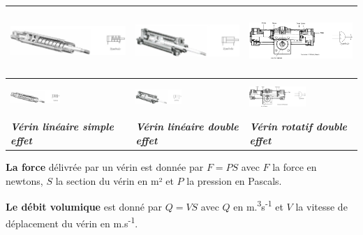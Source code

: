 \begin{longtable}[]{@{}lll@{}}
\toprule
\includegraphics[width=2.18753in,height=0.78785in]{media/image77.png} &
\includegraphics[width=1.94972in,height=0.85305in]{media/image78.png} &
\includegraphics[width=1.95945in,height=0.94776in]{media/image79.png} \\
\midrule
\endhead
\includegraphics[width=0.7365in,height=0.38835in]{media/image80.png} &
\includegraphics[width=0.68657in,height=0.4208in]{media/image81.png} &
\includegraphics[width=0.83815in,height=0.50289in]{media/image82.png} \\
\emph{\textbf{Vérin linéaire simple effet}} & \emph{\textbf{Vérin
linéaire double effet}} & \emph{\textbf{Vérin rotatif double effet}} \\
\bottomrule
\end{longtable}

\textbf{La force} délivrée par un vérin est donnée par \(F = PS\) avec
\(F\) la force en newtons, \(S\) la section du vérin en m² et \(P\) la
pression en Pascals.

\textbf{Le débit volumique} est donné par \(Q = VS\) avec \(Q\) en
m.\textsuperscript{3}s\textsuperscript{-1} et \(V\) la vitesse de
déplacement du vérin en m.s\textsuperscript{-1}.

